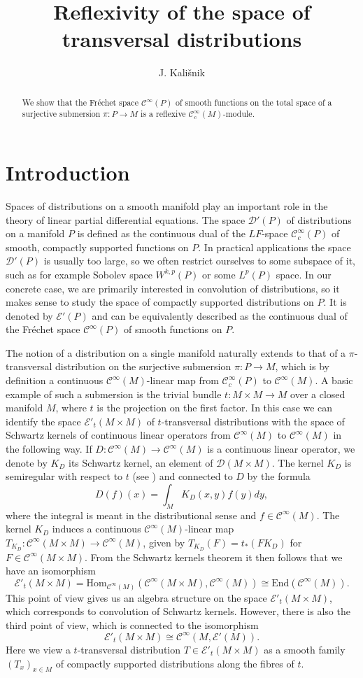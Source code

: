 \documentclass[a4paper]{amsart}
\title[]
      {Reflexivity of the space of transversal distributions}
\author{J. Kali\v{s}nik}
\newcommand{\cD}{\mathcal{D}}
\newcommand{\cE}{\mathcal{E}}
\newcommand{\Hom}{\text{Hom}}
\newcommand{\End}{\text{End}}
\newcommand{\C}{\mathord{\mathcal{C}^{\infty}}}
\newcommand{\Cc}{\mathord{\mathcal{C}^{\infty}_{c}}}
\begin{document}
\begin{abstract}
We show that the Fr\'{e}chet space $\C(P)$ of smooth functions on the total space of a surjective submersion $\pi:P\to M$ is a
reflexive $\Cc(M)$-module.
\end{abstract}



\maketitle

\section{Introduction}

Spaces of distributions on a smooth manifold play an important role in the theory of linear partial differential equations.
The space $\cD'(P)$ of distributions on a manifold $P$ is defined as the continuous dual of the $LF$-space $\Cc(P)$
of smooth, compactly supported functions on $P$. In practical applications the space $\cD'(P)$ is usually too large, so we
often restrict ourselves to some subspace of it, such as for example Sobolev space $W^{k,p}(P)$ or some $L^{p}(P)$ space. In our
concrete case, we are
primarily interested in convolution of distributions, so it makes sense to study
the space of compactly supported distributions on $P$. It is denoted by $\cE'(P)$ and can be equivalently
described as the continuous dual of the Fr\'{e}chet space $\C(P)$ of smooth functions on $P$.

The notion of a distribution on a single manifold naturally extends
to that of a $\pi$-transversal distribution on the surjective submersion $\pi:P\to M$, which is by definition a continuous 
$\C(M)$-linear map from $\Cc(P)$ to $\C(M)$. A basic example of such a submersion is the trivial bundle
$t:M\times M\to M$ over a closed manifold $M$, where $t$ is the projection on the first factor. 
In this case we can identify the space $\cE'_{t}(M\times M)$ of $t$-transversal distributions with the space of
Schwartz kernels of continuous linear operators from $\C(M)$ to $\C(M)$ in the following way. If 
$D:\C(M)\to\C(M)$ is a continuous linear operator, we denote by $K_{D}$ its Schwartz kernel, an element of $\cD(M\times M)$.
The kernel $K_{D}$ is semiregular with respect
to $t$ (see \cite{Tre67}) and connected to $D$ by the formula
\[
D(f)(x)=\int_{M}K_{D}(x,y)f(y)dy,
\]
where the integral is meant in the distributional sense and $f\in\C(M)$. The kernel $K_{D}$ induces a continuous $\C(M)$-linear map
$T_{K_{D}}:\C(M\times M)\to\C(M)$, given by $T_{K_{D}}(F)=t_{*}(FK_{D})$ for $F\in\C(M\times M)$.
From the Schwartz kernels theorem it then follows that we have an isomorphism
\[
\cE'_{t}(M\times M)=\Hom_{\C(M)}(\C(M\times M),\C(M))\cong\End(\C(M)).
\]
This point of view gives us an algebra structure on the space $\cE'_{t}(M\times M)$, which corresponds to convolution of Schwartz kernels. However, there
is also the third point of view, which is connected to the isomorphism
\[
\cE'_{t}(M\times M)\cong\C(M,\cE'(M)).
\]
Here we view a $t$-transversal distribution $T\in\cE'_{t}(M\times M)$ as a smooth family $(T_{x})_{x\in M}$ 
of compactly supported distributions along the fibres of $t$.
\end{document}
